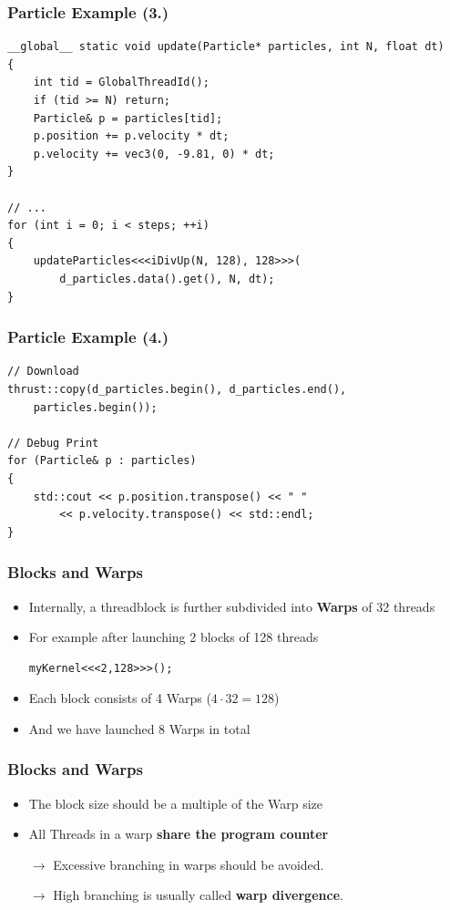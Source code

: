 \documentclass[aspectratio=169]{beamer}
\begin{document}
\begin{frame}[fragile]
\frametitle{Particle Example (3.)}
\begin{lstlisting}
__global__ static void update(Particle* particles, int N, float dt)
{
    int tid = GlobalThreadId();
    if (tid >= N) return;
    Particle& p = particles[tid];
    p.position += p.velocity * dt;
    p.velocity += vec3(0, -9.81, 0) * dt;
}

// ...
for (int i = 0; i < steps; ++i)
{
    updateParticles<<<iDivUp(N, 128), 128>>>(
    	d_particles.data().get(), N, dt);
}
\end{lstlisting}
\end{frame}

\begin{frame}[fragile]
\frametitle{Particle Example (4.)}
\begin{lstlisting}
// Download
thrust::copy(d_particles.begin(), d_particles.end(), 
	particles.begin());

// Debug Print
for (Particle& p : particles)
{
    std::cout << p.position.transpose() << " " 
    	<< p.velocity.transpose() << std::endl;
}
\end{lstlisting}
\end{frame}

\begin{frame}[fragile]
	\frametitle{Blocks and Warps}
\begin{itemize}
\item Internally, a threadblock is further subdivided into \textbf{Warps} of 32 threads
\item For example after launching 2 blocks of 128 threads
\begin{lstlisting}
myKernel<<<2,128>>>();
\end{lstlisting}
\item Each block consists of 4 Warps ($4\cdot 32 = 128$)
\item And we have launched 8 Warps in total
\end{itemize}
\end{frame}

\begin{frame}[fragile]
	\frametitle{Blocks and Warps}
\begin{itemize}
	\item The block size should be a multiple of the Warp size
	\item All Threads in a warp \textbf{share the program counter}
	\item [$\rightarrow$] Excessive branching in warps should be avoided.
	\item [$\rightarrow$] High branching is usually called \textbf{warp divergence}.
\end{itemize}


\end{frame}
\end{document}
